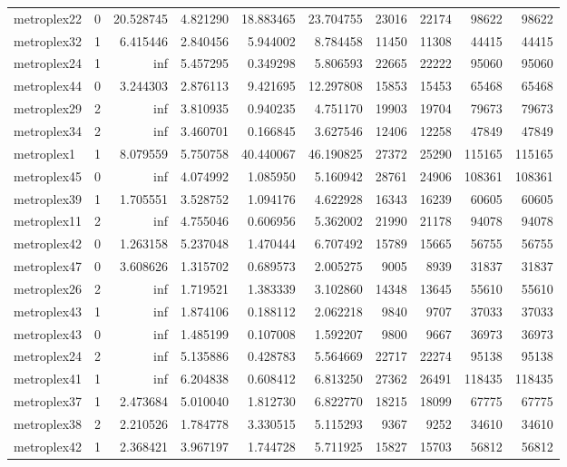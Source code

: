 \begin{longtable}{|l|r|r|r|r|r|r|r|r|r|}
metroplex22 & 0 & 20.528745 & 4.821290 & 18.883465 & 23.704755 & 23016 & 22174 & 98622 & 98622 \\
metroplex32 & 1 & 6.415446 & 2.840456 & 5.944002 & 8.784458 & 11450 & 11308 & 44415 & 44415 \\
metroplex24 & 1 & inf & 5.457295 & 0.349298 & 5.806593 & 22665 & 22222 & 95060 & 95060 \\
metroplex44 & 0 & 3.244303 & 2.876113 & 9.421695 & 12.297808 & 15853 & 15453 & 65468 & 65468 \\
metroplex29 & 2 & inf & 3.810935 & 0.940235 & 4.751170 & 19903 & 19704 & 79673 & 79673 \\
metroplex34 & 2 & inf & 3.460701 & 0.166845 & 3.627546 & 12406 & 12258 & 47849 & 47849 \\
metroplex1 & 1 & 8.079559 & 5.750758 & 40.440067 & 46.190825 & 27372 & 25290 & 115165 & 115165 \\
metroplex45 & 0 & inf & 4.074992 & 1.085950 & 5.160942 & 28761 & 24906 & 108361 & 108361 \\
metroplex39 & 1 & 1.705551 & 3.528752 & 1.094176 & 4.622928 & 16343 & 16239 & 60605 & 60605 \\
metroplex11 & 2 & inf & 4.755046 & 0.606956 & 5.362002 & 21990 & 21178 & 94078 & 94078 \\
metroplex42 & 0 & 1.263158 & 5.237048 & 1.470444 & 6.707492 & 15789 & 15665 & 56755 & 56755 \\
metroplex47 & 0 & 3.608626 & 1.315702 & 0.689573 & 2.005275 & 9005 & 8939 & 31837 & 31837 \\
metroplex26 & 2 & inf & 1.719521 & 1.383339 & 3.102860 & 14348 & 13645 & 55610 & 55610 \\
metroplex43 & 1 & inf & 1.874106 & 0.188112 & 2.062218 & 9840 & 9707 & 37033 & 37033 \\
metroplex43 & 0 & inf & 1.485199 & 0.107008 & 1.592207 & 9800 & 9667 & 36973 & 36973 \\
metroplex24 & 2 & inf & 5.135886 & 0.428783 & 5.564669 & 22717 & 22274 & 95138 & 95138 \\
metroplex41 & 1 & inf & 6.204838 & 0.608412 & 6.813250 & 27362 & 26491 & 118435 & 118435 \\
metroplex37 & 1 & 2.473684 & 5.010040 & 1.812730 & 6.822770 & 18215 & 18099 & 67775 & 67775 \\
metroplex38 & 2 & 2.210526 & 1.784778 & 3.330515 & 5.115293 & 9367 & 9252 & 34610 & 34610 \\
metroplex42 & 1 & 2.368421 & 3.967197 & 1.744728 & 5.711925 & 15827 & 15703 & 56812 & 56812 \\

\end{longtable}
